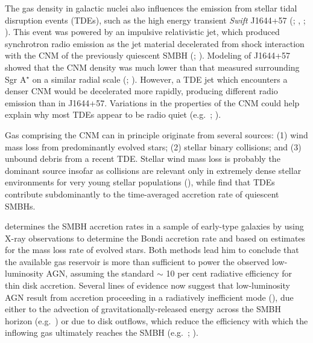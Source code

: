 \documentclass[usenatbib,fleqn]{mn2e}
\newcommand{\Mbh}[1][]{M_{\bullet#1}}
\begin{document}

The gas density in galactic nuclei also influences the emission from
stellar tidal disruption events (TDEs), such as the high energy
transient {\it Swift} J1644+57 (\citealt{Levan+11};
\citealt{Bloom+11}, \citealt{Burrows+11}; \citealt{Zauderer+11}).
This event was powered by an impulsive relativistic jet, which
produced synchrotron radio emission as the jet material decelerated
from shock interaction with the CNM of the previously quiescent SMBH
(\citealt{Giannios&Metzger11}; \citealt{Zauderer+11}).  Modeling of J1644+57 showed that the CNM density was much lower than
that measured surrounding Sgr A$^{\star}$ on a similar radial scale
(\citealt{Metzger+12}; \citealt{BergerZauderer+:2012a}).  However, a
TDE jet which encounters a denser CNM would be decelerated more rapidly,
producing different radio emission than in J1644+57.
Variations in the properties of the CNM could help explain why most
TDEs appear to be radio quiet (e.g.~\citealt{Bower+13};
\citealt{VanVelzen+13}).

Gas comprising the CNM can in principle originate from several
sources: (1) wind mass loss from predominantly evolved stars; (2)
stellar binary collisions; and (3) unbound debris from a recent TDE.
Stellar wind mass loss is probably the dominant source insofar as
collisions are relevant only in extremely dense stellar environments
for very young stellar populations (\citealt{Rubin&Loeb11}), while
\citet{MacLeod+13} find that TDEs contribute subdominantly to the
time-averaged accretion rate of quiescent SMBHs.

\citet{Ho:2009a} determines the SMBH accretion rates in a sample of
early-type galaxies by using X-ray observations to determine the
Bondi accretion rate and based on estimates for the mass loss rate of
evolved stars.  Both methods lead him to conclude that the available
gas reservoir is more than sufficient to power the observed
low-luminosity AGN, assuming the standard $\sim$ 10 per cent radiative
efficiency for thin disk accretion.  Several lines of evidence now suggest that low-luminosity AGN result from accretion
proceeding in a radiatively inefficient mode
(\citealt{Yuan&Narayan14}), due either to the advection of
gravitationally-released energy across the SMBH horizon
(e.g.~\citealt{Narayan&Yi95}) or due to disk outflows, which reduce the efficiency with which the inflowing gas ultimately reaches the SMBH (e.g.~\citealt{Blandford&Begelman99}; \citealt{Li+13}).
\end{document}
